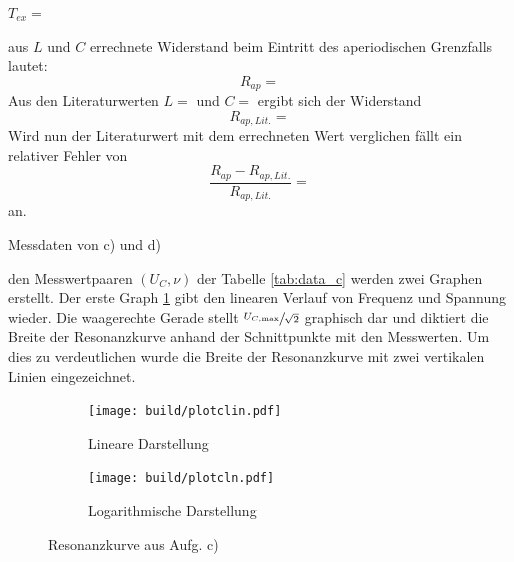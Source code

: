   $T_{ex} =\text{}$


  \justifying aus $L$ und $C$ errechnete Widerstand beim Eintritt des aperiodischen Grenzfalls lautet:
  \begin{equation}
  R_{ap} = \text{} \label{eq:Rap}
  \end{equation}
  Aus den Literaturwerten $L = \text{}$ und $C =\text{}$ ergibt sich der Widerstand 
  \begin{equation}
  R_{ap, Lit.} = \text{} \label{eq:RapLit}
  \end{equation}
  Wird nun der Literaturwert mit dem errechneten Wert verglichen fällt ein relativer Fehler von
  \begin{equation}
  \frac{R_{ap} - R_{ap,Lit.}}{R_{ap,Lit.}} = \text{} \label{eq:RapAbw}
  \end{equation}
  an.


  \begin{table}[H]
        \centering
        \caption{Messdaten von c) und d)}
         
        \label{tab:data_c}
  \end{table}

  \justifying den Messwertpaaren $(U_C, \nu)$ der Tabelle \ref{tab:data_c} werden zwei Graphen erstellt. Der erste Graph \ref{fig:5clin} 
  gibt den linearen Verlauf von Frequenz und Spannung wieder. Die waagerechte Gerade stellt $\sfrac{U_{C,\text{max}}}{\sqrt{2}}$ graphisch dar und diktiert
  die Breite der Resonanzkurve anhand der Schnittpunkte mit den Messwerten. Um dies zu verdeutlichen wurde die Breite der Resonanzkurve mit zwei vertikalen 
  Linien eingezeichnet. 


  \begin{figure}[H]
    \begin{subfigure}{0.495\linewidth}
     \texttt{[image: build/plotclin.pdf]}
     \centering
     \caption{Lineare Darstellung}
     \label{fig:5clin}
    \end{subfigure}
    \begin{subfigure}{0.495\linewidth}
     \texttt{[image: build/plotcln.pdf]}
     \centering
     \caption{Logarithmische Darstellung}
     \label{fig:5cln}
    \end{subfigure}
    \caption{Resonanzkurve aus Aufg. c)}
  \end{figure} 

